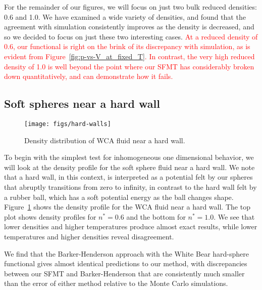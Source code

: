 \documentclass[letterpaper,twocolumn,amsmath,amssymb,prb]{revtex4-1}
\begin{document}
For the remainder of our figures, we will focus on just two bulk
reduced densities: 0.6 and 1.0.  
We have examined a wide variety of
densities, and found that the agreement with simulation consistently
improves as the density is decreased, and so we decided to focus on
just these two interesting cases.  
\textcolor{red}{At a reduced density of 0.6, our
functional is right on the brink of its discrepancy with simulation,
as is evident from Figure~\ref{fig:p-vs-V_at_fixed_T}.  
In contrast, the very high
reduced density of 1.0 is well beyond the point where our SFMT has
considerably broken down quantitatively, and can demonstrate how it
fails.} 


\subsection{Soft spheres near a hard wall}

\begin{figure}
\begin{center}
  \texttt{[image: figs/hard-walls]}
\end{center}
\caption{Density distribution of WCA fluid near a hard wall.}
\label{fig:hard-walls}
\end{figure}

To begin with the simplest test for inhomogeneous one dimensional
behavior, we will look at the density profile for the soft sphere
fluid near a hard wall. We note that a hard wall, in this context, is
interpreted as a potential felt by our spheres that abruptly
transitions from zero to infinity, in contrast to the hard wall felt
by a rubber ball, which has a soft potential energy as the ball
changes shape.  Figure~\ref{fig:hard-walls} shows the density profile
for the WCA fluid near a hard wall.  The top plot shows density
profiles for $n^*=0.6$ and the bottom for $n^*=1.0$. We see that lower
densities and higher temperatures produce almost exact results, while
lower temperatures and higher densities reveal disagreement.

We find that the Barker-Henderson approach with the White Bear
hard-sphere functional gives almost identical predictions to our
method, with discrepancies between our SFMT and Barker-Henderson that
are consistently much smaller than the error of either method relative
to the Monte Carlo simulations.
\end{document}

